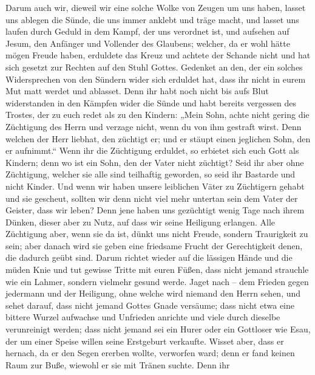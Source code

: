  Darum auch wir, dieweil wir eine solche Wolke von Zeugen
um uns haben, lasset uns ablegen die Sünde, die uns immer anklebt und
träge macht, und lasset uns laufen durch Geduld in dem Kampf, der uns
verordnet ist,  und aufsehen auf Jesum, den Anfänger und
Vollender des Glaubens; welcher, da er wohl hätte mögen Freude haben,
erduldete das Kreuz und achtete der Schande nicht und hat sich gesetzt
zur Rechten auf den Stuhl Gottes.  Gedenket an den, der
ein solches Widersprechen von den Sündern wider sich erduldet hat, dass
ihr nicht in eurem Mut matt werdet und ablasset.  Denn ihr
habt noch nicht bis aufs Blut widerstanden in den Kämpfen wider die
Sünde  und habt bereits vergessen des Trostes, der zu euch
redet als zu den Kindern: „Mein Sohn, achte nicht gering die Züchtigung
des Herrn und verzage nicht, wenn du von ihm gestraft wirst.
 Denn welchen der Herr liebhat, den züchtigt er; und er
stäupt einen jeglichen Sohn, den er aufnimmt.``  Wenn ihr
die Züchtigung erduldet, so erbietet sich euch Gott als Kindern; denn wo
ist ein Sohn, den der Vater nicht züchtigt?  Seid ihr aber
ohne Züchtigung, welcher sie alle sind teilhaftig geworden, so seid ihr
Bastarde und nicht Kinder.  Und wenn wir haben unsere
leiblichen Väter zu Züchtigern gehabt und sie gescheut, sollten wir denn
nicht viel mehr untertan sein dem Vater der Geister, dass wir leben?
 Denn jene haben uns gezüchtigt wenig Tage nach ihrem
Dünken, dieser aber zu Nutz, auf dass wir seine Heiligung erlangen.
 Alle Züchtigung aber, wenn sie da ist, dünkt uns nicht
Freude, sondern Traurigkeit zu sein; aber danach wird sie geben eine
friedsame Frucht der Gerechtigkeit denen, die dadurch geübt sind.
 Darum richtet wieder auf die lässigen Hände und die
müden Knie  und tut gewisse Tritte mit euren Füßen, dass
nicht jemand strauchle wie ein Lahmer, sondern vielmehr gesund werde.
 Jaget nach -- dem Frieden gegen jedermann und der
Heiligung, ohne welche wird niemand den Herrn sehen,  und
sehet darauf, dass nicht jemand Gottes Gnade versäume; dass nicht etwa
eine bittere Wurzel aufwachse und Unfrieden anrichte und viele durch
dieselbe verunreinigt werden;  dass nicht jemand sei ein
Hurer oder ein Gottloser wie Esau, der um einer Speise willen seine
Erstgeburt verkaufte.  Wisset aber, dass er hernach, da
er den Segen ererben wollte, verworfen ward; denn er fand keinen Raum
zur Buße, wiewohl er sie mit Tränen suchte.  Denn ihr
